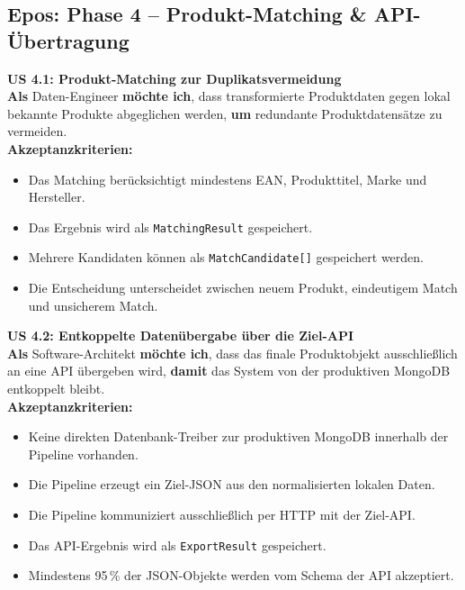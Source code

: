 \documentclass[11pt,a4paper]{article}
\begin{document}
\subsection{Epos: Phase 4 – Produkt-Matching \& API-Übertragung}

\noindent\colorbox{usgray}{%
\begin{minipage}{\dimexpr\textwidth-2\fboxsep\relax}
\textbf{\textcolor{usblue}{US 4.1: Produkt-Matching zur Duplikatsvermeidung}} \\[0.5em]
\textbf{Als} Daten-Engineer \textbf{möchte ich}, dass transformierte Produktdaten gegen lokal bekannte Produkte abgeglichen werden, \textbf{um} redundante Produktdatensätze zu vermeiden.\\[0.5em]
\textbf{Akzeptanzkriterien:}
\begin{itemize}[leftmargin=*, parsep=0pt, topsep=0pt, itemsep=2pt]
    \item Das Matching berücksichtigt mindestens EAN, Produkttitel, Marke und Hersteller.
    \item Das Ergebnis wird als \texttt{MatchingResult} gespeichert.
    \item Mehrere Kandidaten können als \texttt{MatchCandidate[]} gespeichert werden.
    \item Die Entscheidung unterscheidet zwischen neuem Produkt, eindeutigem Match und unsicherem Match.
\end{itemize}
\end{minipage}}
\vspace{1em}

\noindent\colorbox{usgray}{%
\begin{minipage}{\dimexpr\textwidth-2\fboxsep\relax}
\textbf{\textcolor{usblue}{US 4.2: Entkoppelte Datenübergabe über die Ziel-API}} \\[0.5em]
\textbf{Als} Software-Architekt \textbf{möchte ich}, dass das finale Produktobjekt ausschließlich an eine API übergeben wird, \textbf{damit} das System von der produktiven MongoDB entkoppelt bleibt.\\[0.5em]
\textbf{Akzeptanzkriterien:}
\begin{itemize}[leftmargin=*, parsep=0pt, topsep=0pt, itemsep=2pt]
    \item Keine direkten Datenbank-Treiber zur produktiven MongoDB innerhalb der Pipeline vorhanden.
    \item Die Pipeline erzeugt ein Ziel-JSON aus den normalisierten lokalen Daten.
    \item Die Pipeline kommuniziert ausschließlich per HTTP mit der Ziel-API.
    \item Das API-Ergebnis wird als \texttt{ExportResult} gespeichert.
    \item Mindestens 95\,\% der JSON-Objekte werden vom Schema der API akzeptiert.
\end{itemize}
\end{minipage}}
\vspace{1em}
\end{document}
